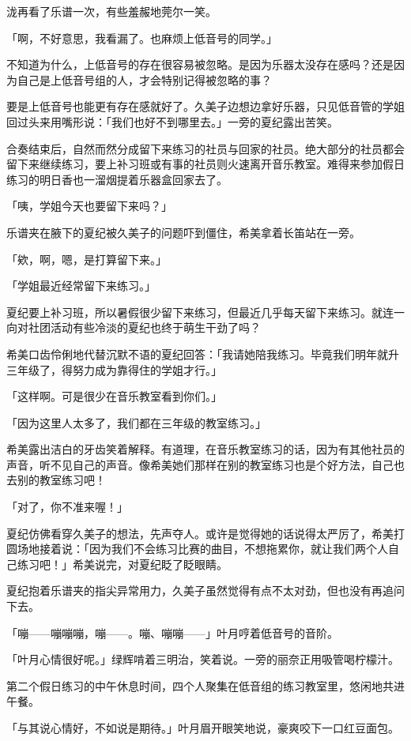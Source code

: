 \documentclass[UTF8]{ctexart}
\begin{document}
    泷再看了乐谱一次，有些羞赧地莞尔一笑。 

    「啊，不好意思，我看漏了。也麻烦上低音号的同学。」 

    不知道为什么，上低音号的存在很容易被忽略。是因为乐器太没存在感吗？还是因为自己是上低音号组的人，才会特别记得被忽略的事？ 

    要是上低音号也能更有存在感就好了。久美子边想边拿好乐器，只见低音管的学姐回过头来用嘴形说：「我们也好不到哪里去。」一旁的夏纪露出苦笑。 

    合奏结束后，自然而然分成留下来练习的社员与回家的社员。绝大部分的社员都会留下来继续练习，要上补习班或有事的社员则火速离开音乐教室。难得来参加假日练习的明日香也一溜烟提着乐器盒回家去了。 

    「咦，学姐今天也要留下来吗？」 

    乐谱夹在腋下的夏纪被久美子的问题吓到僵住，希美拿着长笛站在一旁。 

    「欸，啊，嗯，是打算留下来。」 

    「学姐最近经常留下来练习。」 

    夏纪要上补习班，所以暑假很少留下来练习，但最近几乎每天留下来练习。就连一向对社团活动有些冷淡的夏纪也终于萌生干劲了吗？ 

    希美口齿伶俐地代替沉默不语的夏纪回答：「我请她陪我练习。毕竟我们明年就升三年级了，得努力成为靠得住的学姐才行。」 

    「这样啊。可是很少在音乐教室看到你们。」 

    「因为这里人太多了，我们都在三年级的教室练习。」 

    希美露出洁白的牙齿笑着解释。有道理，在音乐教室练习的话，因为有其他社员的声音，听不见自己的声音。像希美她们那样在别的教室练习也是个好方法，自己也去别的教室练习吧！ 

    「对了，你不准来喔！」 

    夏纪仿佛看穿久美子的想法，先声夺人。或许是觉得她的话说得太严厉了，希美打圆场地接着说：「因为我们不会练习比赛的曲目，不想拖累你，就让我们两个人自己练习吧！」希美说完，对夏纪眨了眨眼睛。 

    夏纪抱着乐谱夹的指尖异常用力，久美子虽然觉得有点不太对劲，但也没有再追问下去。 

    「嘣——嘣嘣嘣，嘣——。嘣、嘣嘣——」叶月哼着低音号的音阶。 

    「叶月心情很好呢。」绿辉啃着三明治，笑着说。一旁的丽奈正用吸管喝柠檬汁。 

    第二个假日练习的中午休息时间，四个人聚集在低音组的练习教室里，悠闲地共进午餐。 

    「与其说心情好，不如说是期待。」叶月眉开眼笑地说，豪爽咬下一口红豆面包。 
\end{document}
